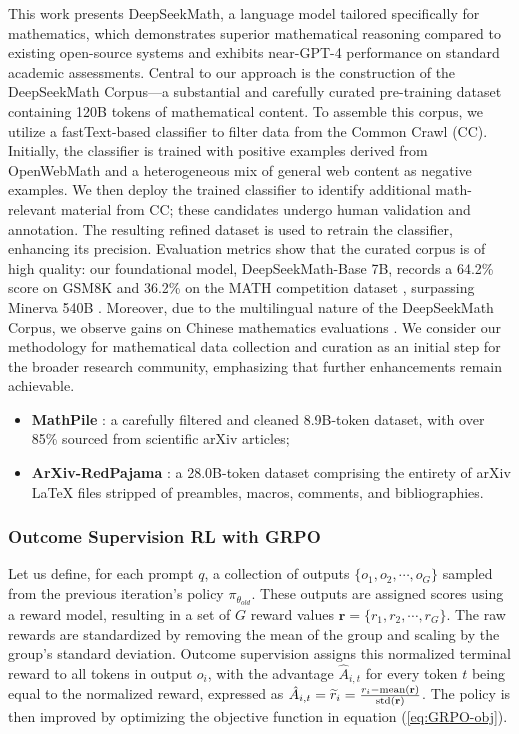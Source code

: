 \begin{itemize}[topsep=0pt]
This work presents DeepSeekMath, a language model tailored specifically for mathematics, which demonstrates superior mathematical reasoning compared to existing open-source systems and exhibits near-GPT-4 performance on standard academic assessments. Central to our approach is the construction of the DeepSeekMath Corpus—a substantial and carefully curated pre-training dataset containing 120B tokens of mathematical content. To assemble this corpus, we utilize a fastText-based classifier \citep{joulin2016fasttext} to filter data from the Common Crawl (CC). Initially, the classifier is trained with positive examples derived from OpenWebMath \citep{openwebmath} and a heterogeneous mix of general web content as negative examples. We then deploy the trained classifier to identify additional math-relevant material from CC; these candidates undergo human validation and annotation. The resulting refined dataset is used to retrain the classifier, enhancing its precision. Evaluation metrics show that the curated corpus is of high quality: our foundational model, DeepSeekMath-Base 7B, records a 64.2\% score on GSM8K \citep{gsm8k} and 36.2\% on the MATH competition dataset \citep{MATH}, surpassing Minerva 540B \citep{minerva}. Moreover, due to the multilingual nature of the DeepSeekMath Corpus, we observe gains on Chinese mathematics evaluations \citep{wei2023cmath,agieval}. We consider our methodology for mathematical data collection and curation as an initial step for the broader research community, emphasizing that further enhancements remain achievable.

\begin{itemize}[topsep=0pt]
    \item \textbf{MathPile} \citep{mathpile}: a carefully filtered and cleaned 8.9B-token dataset, with over 85\% sourced from scientific arXiv articles;
    \item \textbf{ArXiv-RedPajama} \citep{redpajama}: a 28.0B-token dataset comprising the entirety of arXiv LaTeX files stripped of preambles, macros, comments, and bibliographies.
\end{itemize}

\subsubsection{Outcome Supervision RL with GRPO} Let us define, for each prompt $q$, a collection of outputs $\{o_1, o_2, \cdots, o_G\}$ sampled from the previous iteration's policy $\pi_{\theta_{old}}$. These outputs are assigned scores using a reward model, resulting in a set of $G$ reward values $\mathbf{r} = \{r_1, r_2, \cdots, r_G\}$. The raw rewards are standardized by removing the mean of the group and scaling by the group's standard deviation. Outcome supervision assigns this normalized terminal reward to all tokens in output $o_i$, with the advantage $\hat{A}_{i, t}$ for every token $t$ being equal to the normalized reward, expressed as $\hat{A}_{i, t} = \widetilde{r}_i = \frac{r_i- {\rm mean}(\mathbf{r})}{{\rm std}(\mathbf{r})}$. The policy is then improved by optimizing the objective function in equation (\ref{eq:GRPO-obj}).


\end{itemize}
